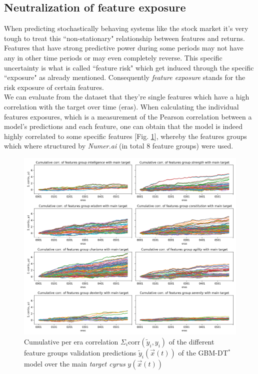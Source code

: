 \documentclass[12pt, a4paper]{article}
\begin{document}
\subsection{Neutralization of feature exposure}
\label{sec: neutralizing}
When predicting stochastically behaving systems like the stock market it's very tough to treat this ``non-stationary" relationship between features and returns. Features that have strong predictive power during some periods may not have any in other time periods or may even completely reverse. This specific uncertainty is what is called ``feature risk" which get induced through the specific ``exposure" as already mentioned. Consequently \textit{feature exposure} stands for the risk exposure of certain features. \\
We can evaluate from the dataset that they're single features which have a high correlation with the target over time (eras). When calculating the individual features exposures, which is a measurement of the Pearson correlation between a model's predictions and each feature, one can obtain that the model is indeed highly correlated to some specific features [Fig. \ref{fig: per_era_correlation}], whereby the features groups which where structured by \textit{Numer.ai} (in total 8 feature groups) were used.
\begin{figure}[!htpb]%
    \centering
    \includegraphics[width=1\textwidth,trim={0 0 0 0},clip]{figures/per_era_correlations.png}
    \caption[Cumulative per era correlation of the different feature groups]{Cumulative per era correlation $\Sigma_i \text{corr}(\tilde{y}_i,y_i)$ of the different feature groups validation predictions $\tilde{y}_i(\vec{x}(t))$ of the GBM-DT$^{\ast}$ model over the main \textit{target cyrus} $y(\vec{x}(t))$}
    \label{fig: per_era_correlation}
\end{figure}
\end{document}
